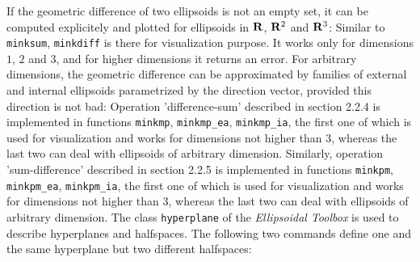 \documentclass{report}
\begin{document}
If the geometric difference of two ellipsoids is not an empty set, it can
be computed explicitely and plotted for ellipsoids in ${\bf R}$,
${\bf R}^2$ and ${\bf R}^3$:
\newpage
{}
Similar to {\tt minksum}, {\tt minkdiff} is there for visualization
purpose. It works only for dimensions $1$, $2$ and $3$, and for higher
dimensions it returns an error. For arbitrary dimensions, the geometric
difference can be approximated by  families of external and internal
ellipsoids parametrized by the direction vector, provided this direction
is not bad:
Operation 'difference-sum' described in section 2.2.4 is implemented in
functions {\tt minkmp}, {\tt minkmp\_ea}, {\tt minkmp\_ia}, the first one of
which is used for visualization and works for dimensions not higher than $3$,
whereas the last two can deal with ellipsoids of arbitrary dimension.
Similarly, operation 'sum-difference' described in section 2.2.5
is implemented in
functions {\tt minkpm}, {\tt minkpm\_ea}, {\tt minkpm\_ia}, the first one of
which is used for visualization and works for dimensions not higher than $3$,
whereas the last two can deal with ellipsoids of arbitrary dimension.
The class {\tt hyperplane} of the {\it Ellipsoidal Toolbox} is used
to describe hyperplanes and halfspaces. The following two commands
define one and the same hyperplane but two different halfspaces:
\end{document}
